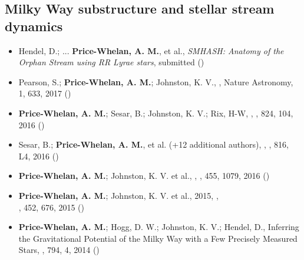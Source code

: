 \documentclass[12pt,letterpaper]{article}
\begin{document}
    \subsection*{Milky Way substructure and stellar stream dynamics}
    \begin{itemize}

\item Hendel, D.; ... {\bf Price-Whelan, A. M.}, et al.,
    {\it SMHASH: Anatomy of the Orphan Stream using RR Lyrae stars},
    submitted ()

\item Pearson, S.; {\bf Price-Whelan, A. M.}; Johnston, K. V.,
    ,
    Nature Astronomy, 1, 633, 2017 ()

\item {\bf Price-Whelan, A. M.}; Sesar, B.; Johnston, K. V.; Rix, H-W,
    ,
    \apj, 824, 104, 2016 ()

\item Sesar, B.; {\bf Price-Whelan, A. M.}, et al. (+12 additional authors),
    ,
    \apjl, 816, L4, 2016 ()

\item {\bf Price-Whelan, A. M.}; Johnston, K. V. et al.,
    ,
    \mnras, 455, 1079, 2016 ()

\item {\bf Price-Whelan, A. M.}; Johnston, K. V. et al., 2015,
    ,\\
    \mnras, 452, 676, 2015 ()

\item {\bf Price-Whelan, A. M.}; Hogg, D. W.; Johnston, K. V.; Hendel, D.,
    {Inferring the Gravitational Potential of the Milky Way with a Few Precisely Measured Stars},
    \apj, 794, 4, 2014 ()

    \end{itemize}
\end{document}
